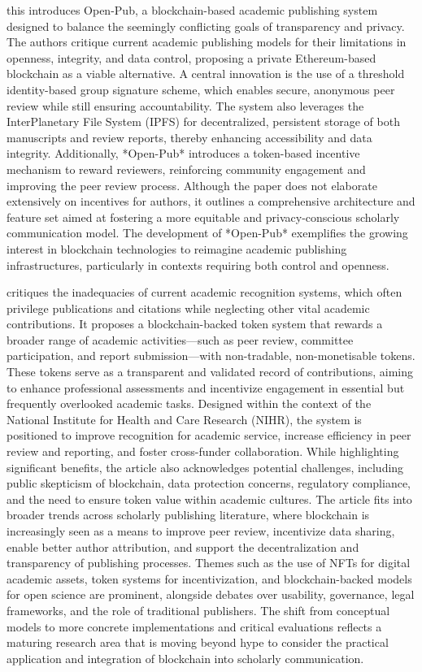 \cite{zhou_open-pub_2021} this introduces Open-Pub, a blockchain-based academic publishing system designed to balance the seemingly conflicting goals of transparency and privacy. The authors critique current academic publishing models for their limitations in openness, integrity, and data control, proposing a private Ethereum-based blockchain as a viable alternative. A central innovation is the use of a threshold identity-based group signature scheme, which enables secure, anonymous peer review while still ensuring accountability. The system also leverages the InterPlanetary File System (IPFS) for decentralized, persistent storage of both manuscripts and review reports, thereby enhancing accessibility and data integrity. Additionally, *Open-Pub* introduces a token-based incentive mechanism to reward reviewers, reinforcing community engagement and improving the peer review process. Although the paper does not elaborate extensively on incentives for authors, it outlines a comprehensive architecture and feature set aimed at fostering a more equitable and privacy-conscious scholarly communication model. The development of *Open-Pub* exemplifies the growing interest in blockchain technologies to reimagine academic publishing infrastructures, particularly in contexts requiring both control and openness.

\cite{lee_unblocking_2023} critiques the inadequacies of current academic recognition systems, which often privilege publications and citations while neglecting other vital academic contributions. It proposes a blockchain-backed token system that rewards a broader range of academic activities—such as peer review, committee participation, and report submission—with non-tradable, non-monetisable tokens. These tokens serve as a transparent and validated record of contributions, aiming to enhance professional assessments and incentivize engagement in essential but frequently overlooked academic tasks. Designed within the context of the National Institute for Health and Care Research (NIHR), the system is positioned to improve recognition for academic service, increase efficiency in peer review and reporting, and foster cross-funder collaboration. While highlighting significant benefits, the article also acknowledges potential challenges, including public skepticism of blockchain, data protection concerns, regulatory compliance, and the need to ensure token value within academic cultures. The article fits into broader trends across scholarly publishing literature, where blockchain is increasingly seen as a means to improve peer review, incentivize data sharing, enable better author attribution, and support the decentralization and transparency of publishing processes. Themes such as the use of NFTs for digital academic assets, token systems for incentivization, and blockchain-backed models for open science are prominent, alongside debates over usability, governance, legal frameworks, and the role of traditional publishers. The shift from conceptual models to more concrete implementations and critical evaluations reflects a maturing research area that is moving beyond hype to consider the practical application and integration of blockchain into scholarly communication.

